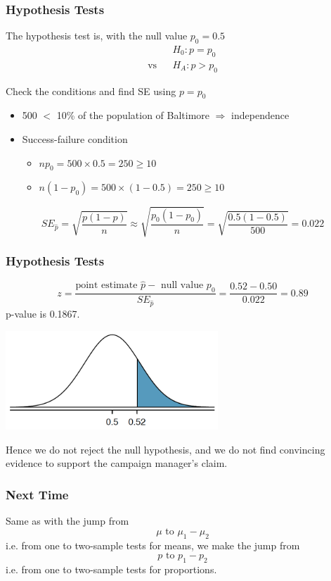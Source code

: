 \documentclass[slides]{beamer}
\newcommand{\blue}[1]{\textcolor{blue2}{#1}}
\newcommand{\phat}{\widehat{p}}
\begin{document}
\begin{frame}[fragile]
\frametitle{Hypothesis Tests}
The hypothesis test is, with the null value $p_0=0.5$
\begin{eqnarray*}
&& H_0: p = p_0\\
\mbox{vs}&& H_A: p > p_0 
\end{eqnarray*}

\pause Check the conditions and find SE \blue{using $p=p_0$}
\begin{itemize}
\pause \item 500 $<$ 10\% of the population of Baltimore $\Rightarrow$ independence
\pause \item Success-failure condition 
\begin{itemize}
\item $np_0 = 500 \times 0.5 = 250 \geq 10$
\item $n(1-p_0) = 500 \times (1-0.5) = 250 \geq 10$
\end{itemize}
\end{itemize}
\pause
\[
SE_{\phat} = \sqrt{\frac{p(1-p)}{n}} \approx \sqrt{\frac{p_0(1-p_0)}{n}} = \sqrt{\frac{0.5(1-0.5)}{500}} = 0.022
\]

\end{frame}


\begin{frame}[fragile]
\frametitle{Hypothesis Tests}
\[
z = \frac{\mbox{point estimate }\phat - \mbox{ null value }p_0}{SE_{\phat}} = \frac{0.52 - 0.50}{0.022} = 0.89
\]
\pause p-value is 0.1867.
\begin{center}
   \includegraphics[width=0.6\textwidth]{figure/pvalue.png} 
\end{center}
\pause Hence we do \blue{not} reject the null hypothesis, and we do not find convincing evidence to support the campaign manager's claim.  

\end{frame}


\begin{frame}[fragile]
\addtocounter{framenumber}{2}
\frametitle{Next Time}

Same as with the jump from 
\[\mu \mbox{ to }\mu_1-\mu_2\] 
i.e. from one to two-sample tests for means, 
we make the jump from 
\[p \mbox{ to }p_1-p_2\]
i.e. from one to two-sample tests for proportions.
\end{frame}
\end{document}
